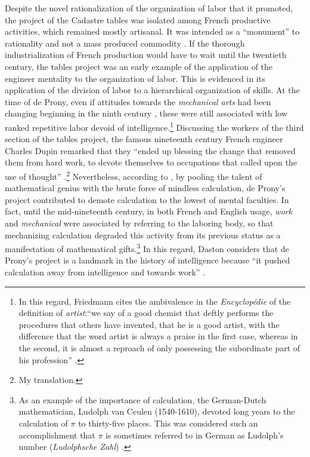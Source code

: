 \documentclass[version=last,draft=false,paper=A4,portrait,twoside=true,twocolumn=false,headinclude=false,footinclude=false,mpinclude=true,fontsize=12,BCOR=20mm,DIV=calc,pagesize=auto,open=right,chapterprefix=true,numbers=autoendperiod,headsepline=false,headings=twolinechapter,parskip=false]{scrbook}
\begin{document}
Despite the novel rationalization of the organization of labor that it
promoted, the project of the Cadastre tables was isolated among French
productive activities, which remained mostly artisanal. It was intended as
a ``monument'' to rationality and not a mass produced commodity
\autocite[57]{prony1804}. If the thorough industrialization of French
production would have to wait until the twentieth century, the tables
project was an early example of the application of the engineer mentality
to the organization of labor. This is evidenced in its application of the
division of labor to a hierarchical organization of skills. At the time of
de Prony, even if attitudes towards the \emph{mechanical arts} had been changing
beginning in the ninth century \autocite[10]{vatin_pillon2003_2007},
these were still associated with low ranked repetitive labor devoid of
intelligence.\footnote{In this regard, Friedmann cites the ambivalence in the \emph{Encyclopédie}
of the definition of \emph{artist}:``we say of a good chemist that deftly
performs the procedures that others have invented, that he is a good
artist, with the difference that the word artist is always a praise in the
first case, whereas in the second, it is almost a reproach of only
possessing the subordinate part of his profession''
\autocite[my translation, footnote 1, p. 55]{friedmann1953}.} Discussing the workers of the third section of the
tables project, the famous nineteenth century French engineer Charles Dupin
remarked that they ``ended up blessing the change that removed them from
hard work, to devote themselves to occupations that called upon the use of
thought'' \autocite[211]{dupin1824}.\footnote{My translation.} Nevertheless, according to
\textcite{daston1994}, by pooling the talent of mathematical genius with the
brute force of mindless calculation, de Prony's project contributed to
demote calculation to the lowest of mental faculties. In fact, until the
mid-nineteenth century, in both French and English usage, \emph{work} and
\emph{mechanical} were associated by referring to the laboring body, so that
mechanizing calculation degraded this activity from its previous status as
a manifestation of mathematical gifts.\footnote{As an example of the importance of calculation, the German-Dutch
mathematician, Ludolph van Ceulen (1540-1610), devoted long years to the
calculation of \(\pi\) to thirty-five places. This was considered such an
accomplishment that \(\pi\) is sometimes referred to in German as Ludolph's
number (\emph{Ludolphsche Zahl}) \autocite[50]{maor1994}.} In this regard, Daston
considers that de Prony's project is a landmark in the history of
intelligence because ``it pushed calculation away from intelligence and
towards work'' \autocite[190]{daston1994}.
\end{document}
